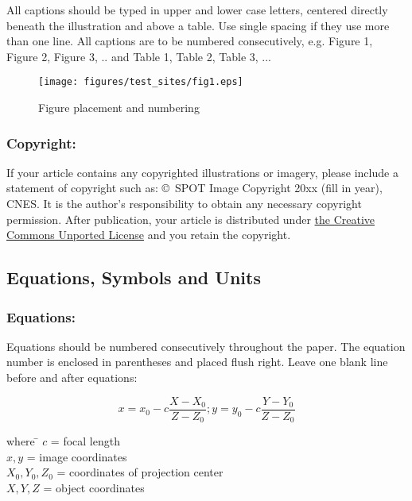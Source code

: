 \documentclass{isprs} %
\begin{document}
All captions should be typed in upper and lower case letters, 
centered directly beneath the illustration and above a table. Use single spacing if they 
use more than one line. All captions are to be numbered consecutively, 
e.g. Figure 1, Figure 2, Figure 3, ..  and Table 1, Table 2, Table 3, ...

\begin{figure}[ht!]
\begin{center}
		\texttt{[image: figures/test\_sites/fig1.eps]}
	\caption{Figure placement and numbering}
\label{fig:figure_placement}
\end{center}
\end{figure}


\subsubsection{Copyright:}\label{sec:Copyright}

If your article contains any copyrighted illustrations or imagery, 
please include a statement of copyright such as: \copyright~SPOT Image Copyright 20xx 
(fill in year), CNES\@. It is the author's responsibility to obtain any necessary 
copyright permission. After publication, your article is distributed under \underline{the Creative 
Commons Unported License} and you retain the copyright.


\subsection{Equations, Symbols and Units}\label{sec:Equations, Symbols and Units}

\subsubsection{Equations:}\label{sec:Equations}

Equations should be numbered consecutively throughout the paper. The equation 
number is enclosed in parentheses and placed flush right. Leave one blank line 
before and after equations: 


\begin{equation}\label{equ:1}
	x = x_0 -c \frac{X - X_0}{Z - Z_0}; y = y_0 -c \frac{Y - Y_0}{Z - Z_0}
\end{equation}

\begin{tabbing} 
where \hspace{0.6cm} \= $c$ = focal length\\
\> $x,y$ = image coordinates\\
\> $X_0,Y_0, Z_0$ = coordinates of projection center\\
\> $X, Y, Z$ = object coordinates
\end{tabbing}
\end{document}
